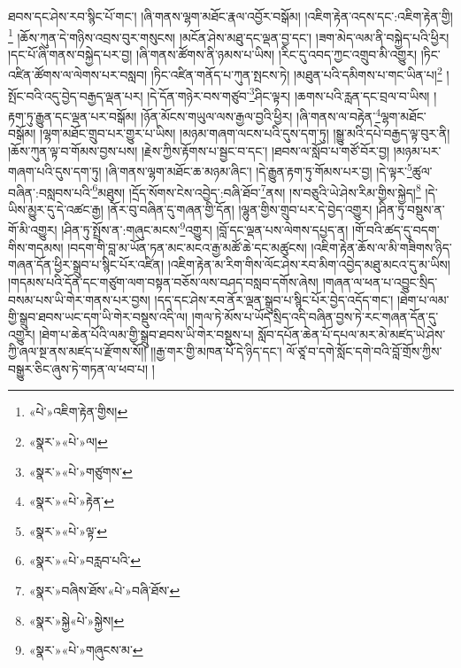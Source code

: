 ཐབས་དང་ཤེས་རབ་སྙིང་པོ་གང་། །ཞི་གནས་ལྷག་མཐོང་རྣལ་འབྱོར་བསྒོམ། །འཇིག་རྟེན་འདས་དང་:འཇིག་རྟེན་གྱི།\footnote{«པེ་»འཇིག་རྟེན་གྱིས།} །ཆོས་ཀུན་དེ་གཉིས་འབྲས་བུར་གསུངས། །མངོན་ཤེས་མཐུ་དང་ལྡན་བྱ་དང་། །ཟག་མེད་ལམ་ནི་བསྐྱེད་པའི་ཕྱིར། །དང་པོ་ཞི་གནས་བསྐྱེད་པར་བྱ། །ཞི་གནས་ཚོགས་ནི་ཉམས་པ་ཡིས། །རིང་དུ་འབད་ཀྱང་འགྲུབ་མི་འགྱུར། །ཏིང་འཛིན་ཚོགས་ལ་ལེགས་པར་བསླབ། །ཏིང་འཛིན་གནོད་པ་ཀུན་སྤངས་ཏེ། །མཐུན་པའི་དམིགས་པ་གང་ཡིན་པ།\footnote{«སྣར་»«པེ་»ལ།} །སྤོང་བའི་འདུ་བྱེད་བརྒྱད་ལྡན་པར། །དེ་དོན་གཉེར་བས་གཙུབ་\footnote{«སྣར་»«པེ་»གཙུགས་}ཤིང་ལྟར། །ཆགས་པའི་རླན་དང་བྲལ་བ་ཡིས། །རྟག་ཏུ་རྒྱུན་དང་ལྡན་པར་བསྒོམ། །ཉོན་མོངས་གཡུལ་ལས་རྒྱལ་བྱའི་ཕྱིར། །ཞི་གནས་ལ་བརྟེན་\footnote{«སྣར་»«པེ་»རྟེན་}ལྷག་མཐོང་བསྒོམ། །ལྷག་མཐོང་གྲུབ་པར་གྱུར་པ་ཡིས། །མཉམ་གཞག་ལངས་པའི་དུས་དག་ཏུ། །སྒྱུ་མའི་དཔེ་བརྒྱད་ལྟ་བུར་ནི། །ཆོས་ཀུན་ལྟ་བ་གོམས་བྱས་པས། །རྗེས་ཀྱིས་རྟོགས་པ་སྦྱང་བ་དང་། །ཐབས་ལ་སློབ་པ་གཙོ་བོར་བྱ། །མཉམ་པར་གཞག་པའི་དུས་དག་ཏུ། །ཞི་གནས་ལྷག་མཐོང་ཆ་མཉམ་ཞིང་། །དེ་རྒྱུན་རྟག་ཏུ་གོམས་པར་བྱ། །དེ་ལྟར་\footnote{«སྣར་»«པེ་»ལྟ་}ཚུལ་བཞིན་:བསླབས་པའི་\footnote{«སྣར་»«པེ་»བརླབ་པའི་}མཐུས། །དྲོད་སོགས་ངེས་འབྱེད་:བཞི་ཐོབ་\footnote{«སྣར་»བཞིས་ཐོས་«པེ་»བཞི་ཐོས་}ནས། །ས་བཅུའི་ཡེ་ཤེས་རིམ་གྱིས་སྐྱེད།\footnote{«སྣར་»སྐྱེ«པེ་»སྐྱེས།} །དེ་ཡིས་མྱུར་དུ་དེ་འཚང་རྒྱ། །ནོར་བུ་བཞིན་དུ་གཞན་གྱི་དོན། །ལྷུན་གྱིས་གྲུབ་པར་དེ་བྱེད་འགྱུར། །ཤིན་ཏུ་བསྡུས་ན་གོ་མི་འགྱུར། །ཤིན་ཏུ་སྤྲོས་ན་:གཞུང་མངས་\footnote{«སྣར་»«པེ་»གཞུངས་མ་}འགྱུར། །བློ་དང་ལྡན་པས་ལེགས་དཔྱད་ན། །གོ་བའི་ཚད་དུ་བདག་གིས་གདམས། །བདག་གི་བླ་མ་ཡོན་ཏན་མང་མངའ་རྒྱ་མཚོ་ཆེ་དང་མཚུངས། །འཇིག་རྟེན་ཆོས་ལ་མི་གཟིགས་ཉིད་གཞན་དོན་ཕྱིར་སྒྲུབ་པ་སྙིང་པོར་འཛིན། །འཇིག་རྟེན་མ་རིག་གིས་ལོང་ཤེས་རབ་མིག་འབྱེད་མཐུ་མངའ་དུ་མ་ཡིས། །གདམས་པའི་དོན་དང་གཙུག་ལག་བསྟན་བཅོས་ལས་བཤད་བསླབ་དགོས་ཞེས། །གཞན་ལ་ཕན་པ་འབྱུང་སྲིད་བསམ་པས་ཡི་གེར་གནས་པར་བྱས། །དད་དང་ཤེས་རབ་ནོར་ལྡན་སྒྲུབ་པ་སྙིང་པོར་བྱེད་འདོད་གང་། །ཐེག་པ་ལམ་གྱི་སྒྲུབ་ཐབས་ཡང་དག་ཡི་གེར་བསྡུས་འདི་ལ། །གལ་ཏེ་མོས་པ་ཡོད་སྲིད་འདི་བཞིན་བྱས་ཏེ་རང་གཞན་དོན་དུ་འགྱུར། །ཐེག་པ་ཆེན་པོའི་ལམ་གྱི་སྒྲུབ་ཐབས་ཡི་གེར་བསྡུས་པ། སློབ་དཔོན་ཆེན་པོ་དཔལ་མར་མེ་མཛད་ཡེ་ཤེས་ཀྱི་ཞལ་སྔ་ནས་མཛད་པ་རྫོགས་སོ།། །།རྒྱ་གར་གྱི་མཁན་པོ་དེ་ཉིད་དང་། ལོ་ཙཱ་བ་དགེ་སློང་དགེ་བའི་བློ་གྲོས་ཀྱིས་བསྒྱུར་ཅིང་ཞུས་ཏེ་གཏན་ལ་ཕབ་པ། ། 